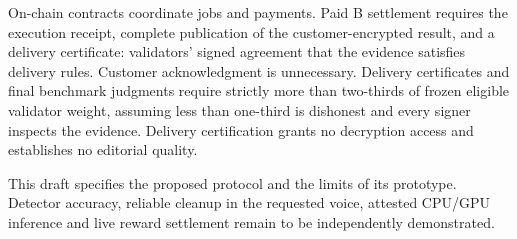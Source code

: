 On-chain contracts coordinate jobs and payments. Paid B settlement
requires the execution receipt, complete publication of the
customer-encrypted result, and a delivery certificate: validators' signed
agreement that the evidence satisfies delivery rules. Customer
acknowledgment is unnecessary. Delivery certificates and final benchmark
judgments require strictly more than two-thirds of frozen eligible
validator weight, assuming less than one-third is dishonest and every
signer inspects the evidence. Delivery certification grants no decryption
access and establishes no editorial quality.

This draft specifies the proposed protocol and the limits of its
prototype. Detector accuracy, reliable cleanup in the requested voice,
attested CPU/GPU inference and live reward settlement remain to be
independently demonstrated.

